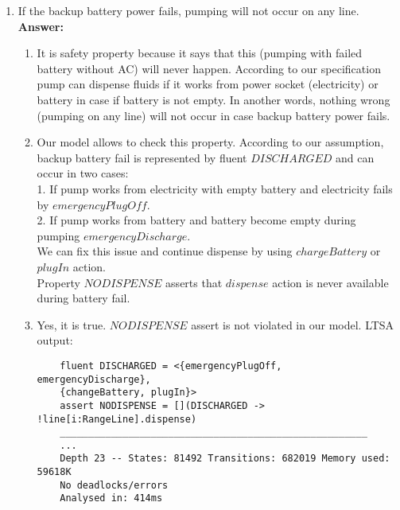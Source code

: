 \documentclass{article}
\begin{document}
\begin{enumerate}
    \item If the backup battery power fails, pumping will not occur on any line.\\
    \textbf{Answer:}
    \begin{enumerate}
    \item It is safety property because it says that this (pumping with failed battery without AC) will never happen. According to our specification pump can dispense fluids if it works from power
    socket (electricity) or battery in case if battery is not empty. In another words, nothing wrong (pumping on any line) will
    not occur in case backup battery power fails.
 
    \item Our model allows to check this property. According to our assumption, backup battery fail is represented by fluent
    $DISCHARGED$ and can occur in two cases:\\
    1. If pump works from electricity with empty battery and electricity fails by $emergencyPlugOff$. \\
    2. If pump works from battery and battery become empty during pumping $emergencyDischarge$. \\
    We can fix this issue and continue dispense by using $chargeBattery$ or $plugIn$ action.\\
    Property $NODISPENSE$ asserts that $dispense$ action is never available during battery fail.
    
    \item  Yes, it is true. $NODISPENSE$ assert is not violated in our model. LTSA output:
    \begin{verbatim}
    fluent DISCHARGED = <{emergencyPlugOff, emergencyDischarge},
    {changeBattery, plugIn}>
    assert NODISPENSE = [](DISCHARGED -> !line[i:RangeLine].dispense)
    ______________________________________________________
    ...
    Depth 23 -- States: 81492 Transitions: 682019 Memory used: 59618K
    No deadlocks/errors
    Analysed in: 414ms
    \end{verbatim} 
    \end{enumerate}    
    

\end{enumerate}
\end{document}
